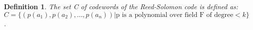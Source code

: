 \documentclass{article}
\newtheorem{codewords}{Definition}
\begin{document}
\begin{codewords}
The set C of codewords of the Reed-Solomon code is defined as:
$C = \{(p(a_{1}),p(a_{2}),...,p(a_{n})) | \text{p is a polynomial over field F of degree} < k\}$.
\end{codewords}
\end{document}
